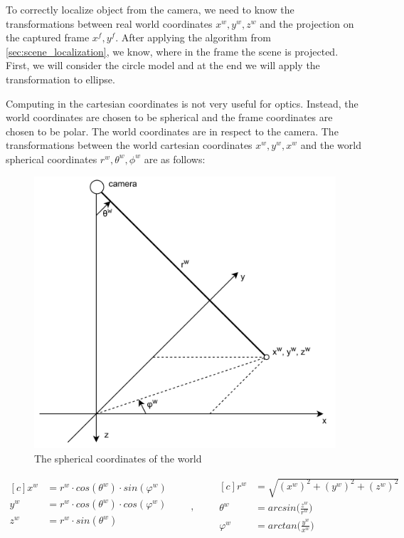 \documentclass[a4paper,12pt,titlepage]{article}
\numberwithin{figure}{section}
\begin{document}
To correctly localize object from the camera, we need to know the transformations between real world coordinates $x^w, y^w, z^w$ and the projection on the captured frame $x^f, y^f$. After applying the algorithm from \ref{sec:scene_localization}, we know, where in the frame the scene is projected. First, we will consider the circle model and at the end we will apply the transformation to ellipse. 

Computing in the cartesian coordinates is not very useful for optics. Instead, the world coordinates are chosen to be spherical and the frame coordinates are chosen to be polar. The world coordinates are in respect to the camera. 
The transformations between the world cartesian coordinates $x^w, y^w, x^w$ and the world spherical coordinates $r^w, \theta^w, \phi^w$ are as follows:

\begin{figure}[h]
\centering
\includegraphics[width=1\linewidth]{fig/sphere.png}
\caption{The spherical coordinates of the world}
\label{fig:sphere}
\end{figure}


\begin{equation*}
\begin{aligned}[c]
x^w &= r^w \cdot cos(\theta^w) \cdot sin(\varphi^w) \\
y^w &= r^w \cdot cos(\theta^w) \cdot cos(\varphi^w) \\
z^w &= r^w \cdot sin(\theta^w) \\
\end{aligned}
\qquad,\qquad
\begin{aligned}[c]
r^w &= \sqrt{(x^w)^2 + (y^w)^2 + (z^w)^2} \\
\theta^w &= arcsin\Big(\frac{z^w}{r^w}\Big) \\
\varphi^w &= arctan\Big(\frac{y^w}{x^w}\Big) \\
\end{aligned}
\end{equation*}
\end{document}
